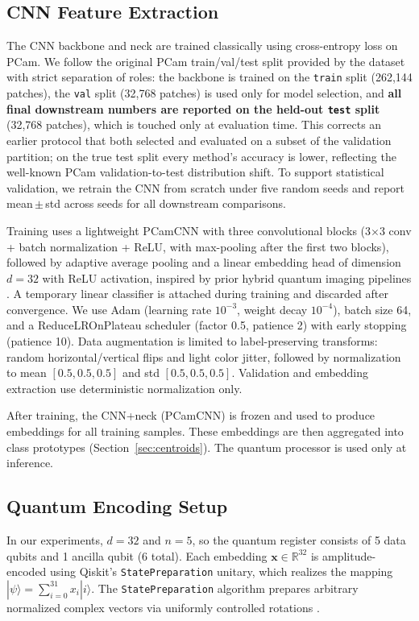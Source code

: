 \documentclass[conference]{IEEEtran}
\begin{document}
\subsection{CNN Feature Extraction}
The CNN backbone and neck are trained classically using cross-entropy loss on PCam. We follow the original PCam train/val/test split provided by the dataset with strict separation of roles: the backbone is trained on the \texttt{train} split (262{,}144 patches), the \texttt{val} split (32{,}768 patches) is used only for model selection, and \textbf{all final downstream numbers are reported on the held-out \texttt{test} split} (32{,}768 patches), which is touched only at evaluation time. This corrects an earlier protocol that both selected and evaluated on a subset of the validation partition; on the true test split every method's accuracy is lower, reflecting the well-known PCam validation-to-test distribution shift. To support statistical validation, we retrain the CNN from scratch under five random seeds and report mean\,$\pm$\,std across seeds for all downstream comparisons.

Training uses a lightweight PCamCNN with three convolutional blocks (3$\times$3 conv + batch normalization + ReLU, with max-pooling after the first two blocks), followed by adaptive average pooling and a linear embedding head of dimension $d=32$ with ReLU activation, inspired by prior hybrid quantum imaging pipelines \cite{pcam_01,pcam_03}. A temporary linear classifier is attached during training and discarded after convergence. We use Adam (learning rate $10^{-3}$, weight decay $10^{-4}$), batch size 64, and a ReduceLROnPlateau scheduler (factor 0.5, patience 2) with early stopping (patience 10). Data augmentation is limited to label-preserving transforms: random horizontal/vertical flips and light color jitter, followed by normalization to mean $[0.5,0.5,0.5]$ and std $[0.5,0.5,0.5]$. Validation and embedding extraction use deterministic normalization only.

After training, the CNN+neck (PCamCNN) is frozen and used to produce embeddings for all training samples. These embeddings are then aggregated into class prototypes (Section~\ref{sec:centroids}). The quantum processor is used only at inference.

\subsection{Quantum Encoding Setup}
In our experiments, $d = 32$ and $n = 5$, so the quantum register consists of 5 data qubits and 1 ancilla qubit (6 total). Each embedding $\mathbf{x} \in \mathbb{R}^{32}$ is amplitude-encoded using Qiskit's \texttt{StatePreparation} unitary, which realizes the mapping $|\psi\rangle = \sum_{i=0}^{31} x_i|i\rangle$. The \texttt{StatePreparation} algorithm prepares arbitrary normalized complex vectors via uniformly controlled rotations \cite{plesch2011quantum}.
\end{document}
